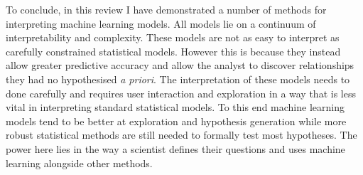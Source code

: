 \documentclass[10pt,]{article}
\begin{document}
To conclude, in this review I have demonstrated  a number of methods for interpreting machine learning models.
All models lie on a continuum of interpretability and complexity.
These models are not as easy to interpret as carefully constrained statistical models.
However this is because they instead allow greater predictive accuracy and allow the analyst to discover relationships they had no hypothesised \emph{a priori}.
The interpretation of these models needs to done carefully and requires user interaction and exploration in a way that is less vital in interpreting standard statistical models.
To this end machine learning models tend to be better at exploration and hypothesis generation while more robust statistical methods are still needed to formally test most hypotheses.
The power here lies in the way a scientist defines their questions and uses machine learning alongside other methods.

 



\end{document}
